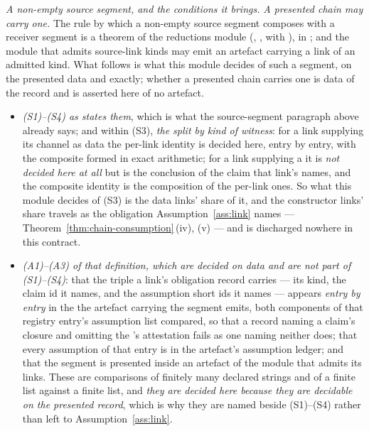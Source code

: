 \begin{definition}
\emph{A non-empty source segment, and the conditions it brings.} \emph{A
presented chain may carry one.} The rule by which a non-empty source segment
composes with a receiver segment is a theorem of the reductions module
(, , with
), in
; and the module that admits source-link kinds may
emit an artefact carrying a link of an admitted kind. What follows is what
this module decides of such a segment, on the presented data and exactly;
whether a presented chain carries one is data of the record and is asserted
here of no artefact.
\begin{itemize}[leftmargin=2.6em]
\item \emph{(S1)--(S4) as 
states them}, which is what the source-segment paragraph above already says;
and within (S3), \emph{the split by kind of witness}: for a link supplying its
channel as data the per-link identity is decided here, entry by entry, with
the composite formed in exact arithmetic; for a link supplying a
 it is \emph{not decided here at all} but is the conclusion of the
claim that link's  names, and the composite identity
is the composition of the per-link ones. So what this module decides of (S3)
is the data links' share of it, and the constructor links' share travels as
the obligation Assumption~\ref{ass:link} names ---
Theorem~\ref{thm:chain-consumption}\,(iv), (v) --- and is discharged nowhere in this
contract.
\item \emph{(A1)--(A3) of that definition, which are decided on data and are
not part of (S1)--(S4)}: that the triple a link's obligation record carries
--- its kind, the claim id it names, and the assumption short ids it names ---
appears \emph{entry by entry} in the  the artefact
carrying the segment emits, both components of that registry entry's
assumption list compared, so that a record naming a claim's closure and
omitting the 's attestation fails as one naming neither
does; that every assumption of that entry is in the artefact's assumption
ledger; and that the segment is presented inside an artefact of the module
that admits its links. These are comparisons of finitely many declared
strings and of a finite list against a finite list, and \emph{they are decided
here because they are decidable on the presented record}, which is why they
are named beside (S1)--(S4) rather than left to Assumption~\ref{ass:link}.

\end{itemize}
\end{definition}
